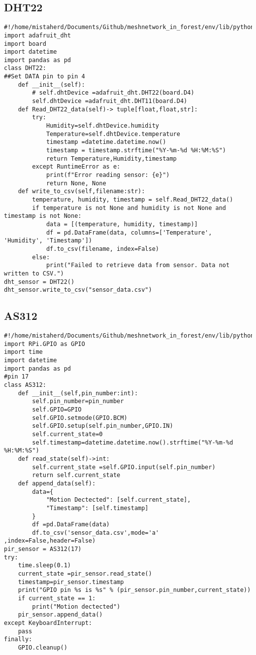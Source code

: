 \subsection{DHT22}
\begin{lstlisting}[style=mystyle,caption={DHT22code}]
#!/home/mistaherd/Documents/Github/meshnetwork_in_forest/env/lib/python3.11
import adafruit_dht 
import board
import datetime
import pandas as pd
class DHT22:
##Set DATA pin to pin 4
    def __init__(self):
        # self.dhtDevice =adafruit_dht.DHT22(board.D4)
        self.dhtDevice =adafruit_dht.DHT11(board.D4)
    def Read_DHT22_data(self)-> tuple[float,float,str]:
        try:
            Humidity=self.dhtDevice.humidity
            Temperature=self.dhtDevice.temperature
            timestamp =datetime.datetime.now()
            timestamp = timestamp.strftime("%Y-%m-%d %H:%M:%S")
            return Temperature,Humidity,timestamp
        except RuntimeError as e:
            print(f"Error reading sensor: {e}")
            return None, None
    def write_to_csv(self,filename:str):
        temperature, humidity, timestamp = self.Read_DHT22_data()
        if temperature is not None and humidity is not None and timestamp is not None:
            data = [(temperature, humidity, timestamp)]
            df = pd.DataFrame(data, columns=['Temperature', 'Humidity', 'Timestamp'])
            df.to_csv(filename, index=False)
        else:
            print("Failed to retrieve data from sensor. Data not written to CSV.")
dht_sensor = DHT22()
dht_sensor.write_to_csv("sensor_data.csv")
\end{lstlisting}
\newpage
\subsection{AS312}
\begin{lstlisting}[style=mystyle,caption={code for  AS312}]
#!/home/mistaherd/Documents/Github/meshnetwork_in_forest/env/lib/python3.11
import RPi.GPIO as GPIO
import time
import datetime
import pandas as pd
#pin 17
class AS312:
	def __init__(self,pin_number:int):
		self.pin_number=pin_number
		self.GPIO=GPIO
		self.GPIO.setmode(GPIO.BCM)
		self.GPIO.setup(self.pin_number,GPIO.IN)
		self.current_state=0
		self.timestamp=datetime.datetime.now().strftime("%Y-%m-%d %H:%M:%S")
	def read_state(self)->int:
		self.current_state =self.GPIO.input(self.pin_number)
		return self.current_state
	def append_data(self):
		data={
			"Motion Dectected": [self.current_state],
			"Timestamp": [self.timestamp]
		}
		df =pd.DataFrame(data)
		df.to_csv('sensor_data.csv',mode='a' ,index=False,header=False)
pir_sensor = AS312(17)
try:
	time.sleep(0.1)
	current_state =pir_sensor.read_state()
	timestamp=pir_sensor.timestamp
	print("GPIO pin %s is %s" % (pir_sensor.pin_number,current_state))
	if current_state == 1:
		print("Motion dectected")
	pir_sensor.append_data()
except KeyboardInterrupt:
	pass
finally:
	GPIO.cleanup()
\end{lstlisting}


